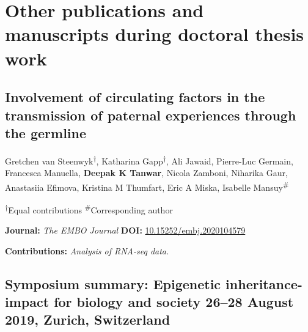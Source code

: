 \documentclass[12pt,twoside]{reedthesis}
\begin{document}

\noindent

\setlength\parindent{0pt}

\hypertarget{other-publications-and-manuscripts-during-doctoral-thesis-work}{%
\section*{Other publications and manuscripts during doctoral thesis work}\label{other-publications-and-manuscripts-during-doctoral-thesis-work}}

\hypertarget{involvement-of-circulating-factors-in-the-transmission-of-paternal-experiences-through-the-germline}{%
\subsection*{Involvement of circulating factors in the transmission of paternal experiences through the germline}\label{involvement-of-circulating-factors-in-the-transmission-of-paternal-experiences-through-the-germline}}

Gretchen van Steenwyk\textsuperscript{$\dagger$}, Katharina Gapp\textsuperscript{$\dagger$}, Ali Jawaid, Pierre-Luc Germain, Francesca Manuella, \textbf{Deepak K Tanwar}, Nicola Zamboni, Niharika Gaur, Anastasiia Efimova, Kristina M Thumfart, Eric A Miska, Isabelle Mansuy\textsuperscript{\#} \newline 

\textsuperscript{$\dagger$}Equal contributions \newline 
\textsuperscript{\#}Corresponding author \newline 

\textbf{Journal:} \emph{The EMBO Journal} \newline 
\textbf{DOI:} \href{https://doi.org/10.15252/embj.2020104579}{10.15252/embj.2020104579}\newline 

\textbf{Contributions:} \emph{Analysis of RNA-seq data.}

\hypertarget{symposium-summary-epigenetic-inheritance-impact-for-biology-and-society-2628-august-2019-zurich-switzerland}{%
\subsection*{Symposium summary: Epigenetic inheritance-impact for biology and society 26--28 August 2019, Zurich, Switzerland}\label{symposium-summary-epigenetic-inheritance-impact-for-biology-and-society-2628-august-2019-zurich-switzerland}}
\end{document}
